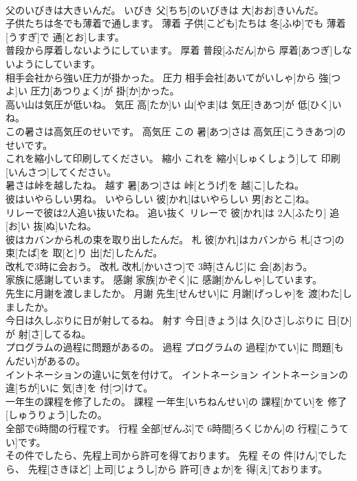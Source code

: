 \documentclass[8pt]{extreport}
\begin{document}
\begin{CJK}{UTF8}{min}
\\	父のいびきは大きいんだ。	いびき	父[ちち]のいびきは 大[おお]きいんだ。	
\\	子供たちは冬でも薄着で通します。	薄着	子供[こども]たちは 冬[ふゆ]でも 薄着[うすぎ]で 通[とお]します。	
\\	普段から厚着しないようにしています。	厚着	普段[ふだん]から 厚着[あつぎ]しないようにしています。	
\\	相手会社から強い圧力が掛かった。	圧力	相手会社[あいてがいしゃ]から 強[つよ]い 圧力[あつりょく]が 掛[か]かった。	
\\	高い山は気圧が低いね。	気圧	高[たか]い 山[やま]は 気圧[きあつ]が 低[ひく]いね。	
\\	この暑さは高気圧のせいです。	高気圧	この 暑[あつ]さは 高気圧[こうきあつ]のせいです。	
\\	これを縮小して印刷してください。	縮小	これを 縮小[しゅくしょう]して 印刷[いんさつ]してください。	
\\	暑さは峠を越したね。	越す	暑[あつ]さは 峠[とうげ]を 越[こ]したね。	
\\	彼はいやらしい男ね。	いやらしい	彼[かれ]はいやらしい 男[おとこ]ね。	
\\	リレーで彼は2人追い抜いたね。	追い抜く	リレーで 彼[かれ]は 2人[ふたり] 追[お]い 抜[ぬ]いたね。	
\\	彼はカバンから札の束を取り出したんだ。	札	彼[かれ]はカバンから 札[さつ]の 束[たば]を 取[と]り 出[だ]したんだ。	
\\	改札で3時に会おう。	改札	改札[かいさつ]で 3時[さんじ]に 会[あ]おう。	
\\	家族に感謝しています。	感謝	家族[かぞく]に 感謝[かんしゃ]しています。	
\\	先生に月謝を渡しましたか。	月謝	先生[せんせい]に 月謝[げっしゃ]を 渡[わた]しましたか。	
\\	今日は久しぶりに日が射してるね。	射す	今日[きょう]は 久[ひさ]しぶりに 日[ひ]が 射[さ]してるね。	
\\	プログラムの過程に問題があるの。	過程	プログラムの 過程[かてい]に 問題[もんだい]があるの。	
\\	イントネーションの違いに気を付けて。	イントネーション	イントネーションの 違[ちが]いに 気[き]を 付[つ]けて。	
\\	一年生の課程を修了したの。	課程	一年生[いちねんせい]の 課程[かてい]を 修了[しゅうりょう]したの。	
\\	全部で6時間の行程です。	行程	全部[ぜんぶ]で 6時間[ろくじかん]の 行程[こうてい]です。	
\\	その件でしたら、先程上司から許可を得ております。	先程	その 件[けん]でしたら、 先程[さきほど] 上司[じょうし]から 許可[きょか]を 得[え]ております。	

\end{CJK}
\end{document}

